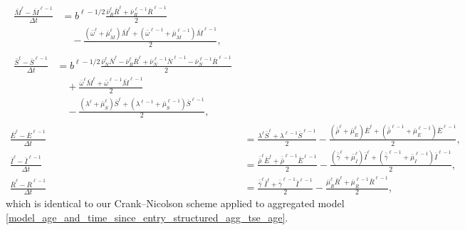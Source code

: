 \documentclass[USenglish]{article}
\begin{document}
\begin{subequations}
  \label{numerics_age_and_time_since_entry_structured_agg_tse_age}
  \begin{align}
    \begin{split}
      \frac{\bar{M}^{\ell} - \bar{M}^{\ell - 1}}{\Delta t}
      &= b^{\ell - 1 / 2} \frac{\bar{\nu}_R^{\ell} \bar{R}^{\ell}
        + \bar{\nu}_R^{\ell - 1} \bar{R}^{\ell - 1}}{2}
      \\ & \quad {}
      - \frac{(\bar{\omega}^{\ell} + \bar{\mu}_M^{\ell}) \bar{M}^{\ell}
        + (\bar{\omega}^{\ell - 1} + \bar{\mu}_M^{\ell - 1}) \bar{M}^{\ell - 1}}
      {2},
    \end{split}
    \\
    \begin{split}
      \frac{\bar{S}^{\ell} - \bar{S}^{\ell - 1}}{\Delta t}
      &= b^{\ell - 1 / 2}
      \frac{\bar{\nu}_N^{\ell} \bar{N}^{\ell}
        - \bar{\nu}_R^{\ell} \bar{R}^{\ell}
        + \bar{\nu}_N^{\ell - 1} \bar{N}^{\ell - 1}
        - \bar{\nu}_N^{\ell - 1} \bar{R}^{\ell - 1}}{2}
      \\ & \quad {}
      + \frac{\bar{\omega}^{\ell} \bar{M}^{\ell}
        + \bar{\omega}^{\ell - 1} \bar{M}^{\ell - 1}}{2}
      \\ & \quad {}
      - \frac{(\lambda^{\ell} + \bar{\mu}_S^{\ell}) \bar{S}^{\ell}
        + (\lambda^{\ell - 1} + \bar{\mu}_S^{\ell - 1}) \bar{S}^{\ell - 1}}{2},
    \end{split}
    \\
    \frac{\bar{E}^{\ell} - \bar{E}^{\ell - 1}}{\Delta t}
    &= \frac{\lambda^{\ell} \bar{S}^{\ell}
      + \lambda^{\ell - 1} \bar{S}^{\ell - 1}}{2}
    - \frac{(\bar{\bar{\rho}}^{\ell} + \bar{\mu}_E^{\ell}) \bar{E}^{\ell}
      + (\bar{\bar{\rho}}^{\ell - 1} + \bar{\mu}_E^{\ell - 1}) \bar{E}^{\ell - 1}}
    {2},
    \\
    \frac{\bar{I}^{\ell} - \bar{I}^{\ell - 1}}{\Delta t}
    &= \frac{\bar{\bar{\rho}}^{\ell} \bar{E}^{\ell}
      + \bar{\bar{\rho}}^{\ell - 1} \bar{E}^{\ell - 1}} {2}
    - \frac{(\bar{\bar{\gamma}}^{\ell} + \bar{\mu}_I^{\ell}) \bar{I}^{\ell}
      + (\bar{\bar{\gamma}}^{\ell - 1} + \bar{\mu}_I^{\ell - 1})
      \bar{I}^{\ell - 1}}
    {2},
    \\
    \frac{\bar{R}^{\ell} - \bar{R}^{\ell - 1}}{\Delta t}
    &= \frac{\bar{\bar{\gamma}}^{\ell} \bar{I}^{\ell}
      + \bar{\bar{\gamma}}^{\ell - 1} \bar{I}^{\ell - 1}}
    {2}
    - \frac{\bar{\mu}_R^{\ell} \bar{R}^{\ell}
      + \bar{\mu}_R^{\ell - 1} \bar{R}^{\ell - 1}}
    {2},
  \end{align}
\end{subequations}
which is identical to our Crank--Nicolson scheme applied to aggregated
model \eqref{model_age_and_time_since_entry_structured_agg_tse_age}.
\end{document}
